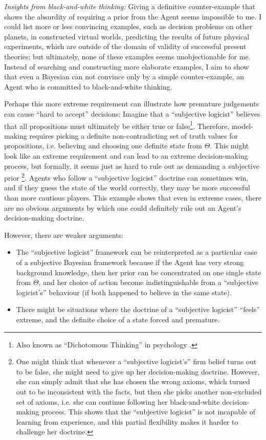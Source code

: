 \documentclass{article}
\begin{document}
{\it Insights from black-and-white thinking:}
Giving a definitive counter-example that shows the absurdity of requiring a prior from the Agent seems impossible to me. I could list more or less convincing examples, such as decision problems on other planets, in constructed virtual worlds, predicting the results of future physical experiments, which are outside of the domain of validity of successful present theories; but ultimately, none of these examples seems unobjectionable for me.
Instead of searching and constructing more elaborate examples, I aim to show that even a Bayesian can not convince only by a simple counter-example, an Agent who is committed to black-and-white thinking.

Perhaps this more extreme requirement can illustrate how premature judgements can cause ``hard to accept'' decisions:
Imagine that a ``subjective logicist'' believes that all propositions must ultimately be either true or false\footnote{Also known as ``Dichotomous Thinking'' in psychology \cite{book:DichotomousCBT}.}. Therefore, model-making requires picking a definite non-contradicting set of truth values for propositions, i.e. believing and choosing one definite state from $\Theta$.
This might look like an extreme requirement and can lead to an extreme decision-making process, but formally, it seems just as hard to rule out as demanding a subjective prior
\footnote{
One might think that whenever a ``subjective logicist's'' firm belief turns out to be false, she might need to give up her decision-making doctrine.
However, she can simply admit that she has chosen the wrong axioms, which turned out to be inconsistent with the facts, but then she picks another non-excluded set of axioms, i.e. she can continue following her black-and-white decision-making process.
This shows that the ``subjective logicist'' is not incapable of learning from experience, and this partial flexibility makes it harder to challenge her doctrine.
}. Agents who follow a ``subjective logicist'' doctrine can sometimes win, and if they guess the state of the world correctly, they may be more successful than more cautious players.
This example shows that even in extreme cases, there are no obvious arguments by which one could definitely rule out an Agent's decision-making doctrine.

However, there are weaker arguments:
\begin{itemize}
    \item The ``subjective logicist'' framework can be reinterpreted as a particular case of a subjective Bayesian framework because if the Agent has very strong background knowledge, then her prior can be concentrated on one single state from $\Theta$, and her choice of action become indistinguishable from a ``subjective logicist's'' behaviour (if both happened to believe in the same state).
    \item There might be situations where the doctrine of a ``subjective logicist'' ``feels'' extreme, and the definite choice of a state forced and premature.
\end{itemize}
\end{document}
